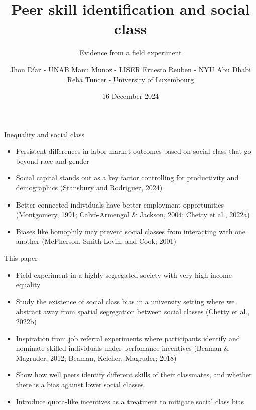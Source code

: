 \documentclass[aspectratio=169,xcolor=dvipsnames]{beamer}
\title[short title]{Peer skill identification and social class} %
\subtitle{Evidence from a field experiment}
\author[Pin-Yen] {Jhon Díaz - UNAB \newline Manu Munoz - LISER \newline Ernesto Reuben - NYU Abu Dhabi \newline Reha Tuncer - University of Luxembourg}
\date{16 December 2024} %
\begin{document}
\begin{frame}
    \titlepage
\end{frame}

\begin{frame}{Inequality and social class}
     \begin{itemize}
    \item Persistent differences in labor market outcomes based on social class that go beyond race and gender
    \item Social capital stands out as a key factor controlling for productivity and demographics (Stansbury and Rodriguez, 2024)
    \item Better connected individuals have better employment opportunities (Montgomery, 1991; Calvó-Armengol \& Jackson, 2004; Chetty et al., 2022a)
    \item Biases like homophily may prevent social classes from interacting with one another (McPherson, Smith-Lovin, and Cook; 2001)  
    \end{itemize}
\end{frame}

\begin{frame}{This paper}
    \begin{itemize}
    \item Field experiment in a highly segregated society with very high income equality 
    \item Study the existence of social class bias in a university setting where we abstract away from spatial segregation between social classes (Chetty et al., 2022b)
   \item Inspiration from job referral experiments where participants identify and nominate skilled individuals under perfomance incentives (Beaman \& Magruder, 2012; Beaman, Keleher, Magruder; 2018)
   \item Show how well peers identify different skills of their classmates, and whether there is a bias against lower social classes
   \item Introduce quota-like incentives as a treatment to mitigate social class bias
\end{itemize}

\end{frame}
\end{document}
